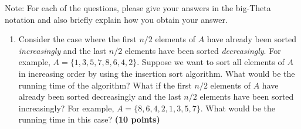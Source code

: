 \documentclass{article}
\begin{document}
Note: For each of the questions, please give your answers in the
big-Theta notation and also briefly explain how you obtain your answer.

\begin{enumerate}[label=(\alph*)]
\item Consider the case where the first $n/2$ elements of $A$ have
already been sorted \emph{increasingly} and the last $n/2$ elements
have been sorted \emph{decreasingly}. For example, $A = \{1, 3, 5, 7,
8, 6, 4, 2\}$. Suppose we want to sort all elements of $A$ in
increasing order by using the insertion sort algorithm. What would be
the running time of the algorithm? What if the first $n/2$ elements of
$A$ have already been sorted decreasingly and the last $n/2$ elements
have been sorted increasingly? For example, $A = \{8, 6, 4, 2, 1, 3,
5, 7\}$. What would be the running time in this case? {\bf (10 points)}


\end{enumerate}
\end{document}
